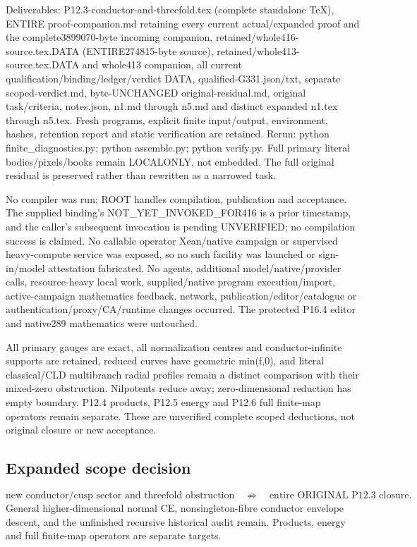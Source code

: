 \documentclass[11pt]{article}
\begin{document}
Deliverables: P12.3-conductor-and-threefold.tex (complete standalone TeX), ENTIRE proof-companion.md retaining every current actual/expanded proof and the complete3899070-byte incoming companion, retained/whole416-source.tex.DATA (ENTIRE274815-byte source), retained/whole413-source.tex.DATA and whole413 companion, all current qualification/binding/ledger/verdict DATA, qualified-G331.json/txt, separate scoped-verdict.md, byte-UNCHANGED original-residual.md, original task/criteria, notes.json, n1.md through n5.md and distinct expanded n1.tex through n5.tex. Fresh programs, explicit finite input/output, environment, hashes, retention report and static verification are retained. Rerun: python finite\_diagnostics.py; python assemble.py; python verify.py. Full primary literal bodies/pixels/books remain LOCALONLY, not embedded. The full original residual is preserved rather than rewritten as a narrowed task.

No compiler was run; ROOT handles compilation, publication and acceptance. The supplied binding's NOT\_YET\_INVOKED\_FOR416 is a prior timestamp, and the caller's subsequent invocation is pending UNVERIFIED; no compilation success is claimed. No callable operator Xean/native campaign or supervised heavy-compute service was exposed, so no such facility was launched or sign-in/model attestation fabricated. No agents, additional model/native/provider calls, resource-heavy local work, supplied/native program execution/import, active-campaign mathematics feedback, network, publication/editor/catalogue or authentication/proxy/CA/runtime changes occurred. The protected P16.4 editor and native289 mathematics were untouched.

All primary gauges are exact, all normalization centres and conductor-infinite supports are retained, reduced curves have geometric min(f,0), and literal classical/CLD multibranch radial profiles remain a distinct comparison with their mixed-zero obstruction. Nilpotents reduce away; zero-dimensional reduction has empty boundary. P12.4 products, P12.5 energy and P12.6 full finite-map operators remain separate. These are unverified complete scoped deductions, not original closure or new acceptance.

\subsection*{Expanded scope decision}
\[
\text{new conductor/cusp sector and threefold obstruction}
\quad\not\Longrightarrow\quad\text{entire ORIGINAL P12.3 closure}.
\]
General higher-dimensional normal CE, nonsingleton-fibre conductor
envelope descent, and the unfinished recursive historical audit remain.
Products, energy and full finite-map operators are separate targets.
\end{document}
